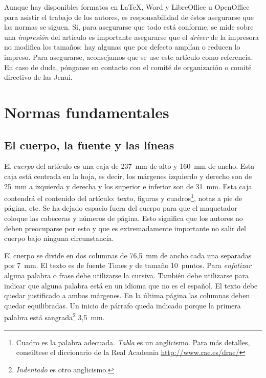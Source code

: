 \documentclass[twocolumn,twoside,a4paper, 10pt]{article}
\begin{document}
Aunque hay disponibles formatos en \LaTeX, Word y LibreOffice u OpenOffice para
asistir el trabajo de los autores, es responsabilidad de éstos
asegurarse que las normas se siguen.  Si, para asegurarse que todo
está conforme, se mide sobre una \emph{impresión} del artículo es
importante asegurarse que el \emph{driver} de la impresora no modifica
los tamaños: hay algunas que por defecto amplían o reducen lo impreso.
Para asegurarse, aconsejamos que se use este artículo como referencia.
En caso de duda, pónganse en contacto con el comité de organización o
comité directivo de las Jenui.

\section{Normas fundamentales \label{sec:fund}} 

\subsection{El cuerpo, la fuente y las líneas}

El \emph{cuerpo} del artículo es una caja de 237~mm de alto y 160~mm
de ancho.  Esta caja está centrada en la hoja, es decir, los márgenes
izquierdo y derecho son de 25~mm a izquierda y derecha y los superior
e inferior son de 31~mm.  Esta caja contendrá el contenido del
artículo: texto, figuras y cuadros\footnote{Cuadro es la palabra
adecuada. \emph{Tabla} es un anglicismo.  Para más detalles,
consúltese el diccionario de la Real Academia
\url{http://www.rae.es/drae/}}, notas a pie de página, etc.  Se ha
dejado espacio fuera del cuerpo para que el maquetador coloque las
cabeceras y números de página.  Esto significa que los autores no
deben preocuparse por esto y que es extremadamente importante no 
salir del cuerpo bajo ninguna circunstancia.

El cuerpo se divide en dos columnas de 76,5~mm de ancho cada una 
separadas por 7~mm. El texto es de fuente Times y de tamaño 10~puntos. 
Para \emph{enfatizar} alguna palabra o frase debe utilizarse la 
cursiva. También debe utilizarse para indicar que alguna palabra está 
en un idioma que no es el español. El texto debe quedar justificado a 
ambos márgenes. En la última página las columnas deben quedar 
equilibradas.
Un inicio de párrafo queda indicado porque la primera palabra está
sangrada\footnote{\emph{Indentado} es otro anglicismo.} 3,5~mm.
\end{document}
